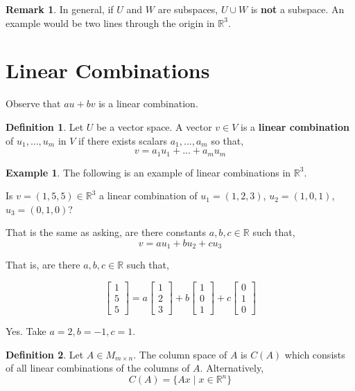 \documentclass{report}
\theoremstyle{definition}
\newtheorem{_def}{Definition}
\newtheorem{_rem}{Remark}
\newtheorem{ex}{Example}
\begin{document}
\begin{_rem}
In general, if $U$ and $W$ are subspaces, $U\cup W$ is \textbf{not} a subspace.
An example would be two lines through the origin in $\mathbb{R}^3$.
\end{_rem}

\section{Linear Combinations}

Observe that $au+bv$ is a linear combination.

\begin{_def}
Let $U$ be a vector space.
A vector $v\in V$ is a \textbf{linear combination} of $u_1,...,u_m$ in $V$ if there exists scalars $a_1,...,a_m$ so that,
\[v=a_1u_1+...+a_mu_m\]
\end{_def}

\begin{ex}
The following is an example of linear combinations in $\mathbb{R}^3$.

Is $v=(1,5,5)\in \mathbb{R}^3$ a linear combination of $u_1=(1,2,3)$, $u_2=(1,0,1)$, $u_3=(0,1,0)$?

That is the same as asking, are there constants $a, b, c\in \mathbb{R}$ such that,
\[v=au_1+bu_2+cu_3\]

That is, are there $a,b,c\in \mathbb{R}$ such that,

\[\begin{bmatrix}
1 \\ 5 \\ 5
\end{bmatrix}=a\begin{bmatrix}
1 \\ 2 \\ 3
\end{bmatrix}+b\begin{bmatrix}
1 \\ 0 \\ 1
\end{bmatrix}+c\begin{bmatrix}
0 \\ 1 \\ 0
\end{bmatrix}\]

Yes. Take $a=2, b=-1, c=1$.
\end{ex}

\begin{_def}
Let $A\in M_{m\times n}$.
The column space of $A$ is $C(A)$ which consists of all linear combinations of the columns of $A$.
Alternatively,
\[C(A)=\{Ax\mid x\in \mathbb{R}^n\}\]
\end{_def}
\end{document}
